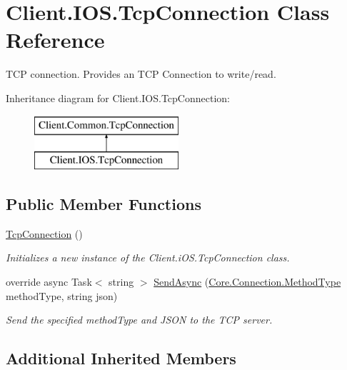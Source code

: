 \hypertarget{classClient_1_1IOS_1_1TcpConnection}{}\section{Client.\+I\+O\+S.\+Tcp\+Connection Class Reference}
\label{classClient_1_1IOS_1_1TcpConnection}


T\+C\+P connection. Provides an T\+C\+P Connection to write/read.  


Inheritance diagram for Client.\+I\+O\+S.\+Tcp\+Connection\+:\begin{figure}[H]
\begin{center}
\leavevmode
\includegraphics[height=2.000000cm]{classClient_1_1IOS_1_1TcpConnection}
\end{center}
\end{figure}
\subsection*{Public Member Functions}
\begin{DoxyCompactItemize}
\item 
\hyperlink{classClient_1_1IOS_1_1TcpConnection_a8322bc353a0268fc3d6f3af5d155e154}{Tcp\+Connection} ()
\begin{DoxyCompactList}\small\item\em Initializes a new instance of the Client.\+i\+O\+S.\+Tcp\+Connection class. \end{DoxyCompactList}\item 
override async Task$<$ string $>$ \hyperlink{classClient_1_1IOS_1_1TcpConnection_a4042b0eb4bcf77100e9f6480f78bbd39}{Send\+Async} (\hyperlink{namespaceCore_1_1Connection_a759585506f1f7f357beb5c5460a7f4f5}{Core.\+Connection.\+Method\+Type} method\+Type, string json)
\begin{DoxyCompactList}\small\item\em Send the specified method\+Type and J\+S\+O\+N to the T\+C\+P server. \end{DoxyCompactList}\end{DoxyCompactItemize}
\subsection*{Additional Inherited Members}


